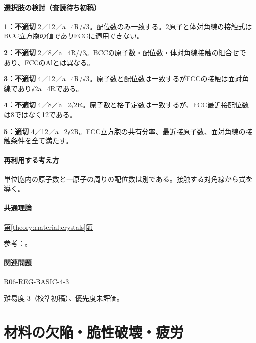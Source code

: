 \paragraph{選択肢の検討（査読待ち初稿）}\mbox{}\par

\noindent\textbf{1：不適切} 2／12／a=\allowbreak{}4R/√3。配位数のみ一致する。2原子と体対角線の接触式はBCC立方胞の値でありFCCに適用できない。\par

\noindent\textbf{2：不適切} 2／8／a=\allowbreak{}4R/√3。BCCの原子数・配位数・体対角線接触の組合せであり、FCCのAlとは異なる。\par

\noindent\textbf{3：不適切} 4／12／a=\allowbreak{}4R/√3。原子数と配位数は一致するがFCCの接触は面対角線であり√2a=\allowbreak{}4Rである。\par

\noindent\textbf{4：不適切} 4／8／a=\allowbreak{}2√2R。原子数と格子定数は一致するが、FCC最近接配位数は8ではなく12である。\par

\noindent\textbf{5：適切} 4／12／a=\allowbreak{}2√2R。FCC立方胞の共有分率、最近接原子数、面対角線の接触条件を全て満たす。\par

\paragraph{再利用する考え方} 単位胞内の原子数と一原子の周りの配位数は別である。接触する対角線から式を導く。

\paragraph{共通理論} \hyperref[theory:material:crystals]{第\ref*{theory:material:crystals}節}

\par 参考：\cite{cambridge_unitcell,openstax_crystals}。

\paragraph{関連問題} \hyperref[q:r06-reg-basic-4-3]{R06-REG-BASIC-4-3}

\par 難易度 3（校準初稿）、優先度未評価。

\section{材料の欠陥・脆性破壊・疲労}


